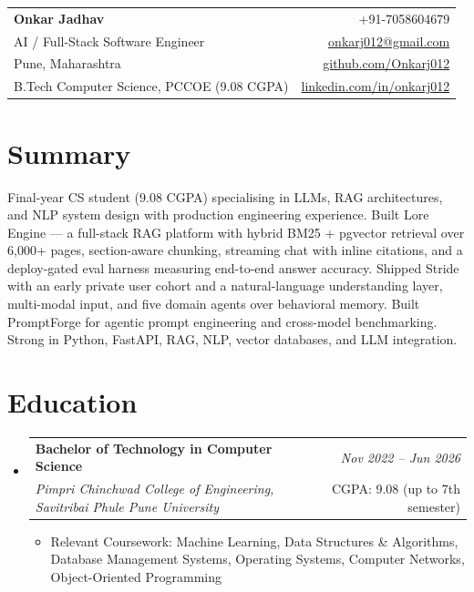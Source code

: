\documentclass[a4paper,11pt]{article}
\makeatletter
\newcommand{\resumeSubheading}[4]{
\vspace{0.5mm}\item
    \begin{tabular*}{0.98\textwidth}[t]{l@{\extracolsep{\fill}}r}
        \textbf{#1} & \textit{\footnotesize{#4}} \\
        \textit{\footnotesize{#3}} & \footnotesize{#2}\\
    \end{tabular*}
    \vspace{-2.4mm}
}
\newcommand{\resumeSubHeadingListStart}{\begin{itemize}[leftmargin=*,labelsep=0mm]}
\newcommand{\resumeItemListStart}{\begin{justify}\begin{itemize}[leftmargin=3ex, rightmargin=2ex, noitemsep,labelsep=1.2mm,itemsep=0mm]\small}
\newcommand{\resumeSubHeadingListEnd}{\end{itemize}\vspace{2mm}}
\newcommand{\resumeItemListEnd}{\end{itemize}\end{justify}\vspace{-2mm}}
\newcommand{\name}{Onkar Jadhav}
\newcommand{\phone}{7058604679}
\newcommand{\emaila}{onkarj012@gmail.com}
\newcommand{\github}{github.com/Onkarj012}
\newcommand{\linkedin}{linkedin.com/in/onkarj012}
\makeatother
\begin{document}
\begin{tabularx}{\linewidth}{L r}
  \textbf{\Large \name} & {+91-\phone} \\
  {AI / Full-Stack Software Engineer} & \href{mailto:\emaila}{\emaila} \\
  {Pune, Maharashtra} & \href{https://\github}{\github} \\
  {B.Tech Computer Science, PCCOE (9.08 CGPA)} & \href{https://\linkedin}{\linkedin}
\end{tabularx}
\vspace{-4mm}

\section{\textbf{Summary}}
\vspace{1mm}
\small{
Final-year CS student (9.08 CGPA) specialising in LLMs, RAG architectures, and NLP system design with production engineering experience. Built Lore Engine --- a full-stack RAG platform with hybrid BM25 + pgvector retrieval over 6,000+ pages, section-aware chunking, streaming chat with inline citations, and a deploy-gated eval harness measuring end-to-end answer accuracy. Shipped Stride with an early private user cohort and a natural-language understanding layer, multi-modal input, and five domain agents over behavioral memory. Built PromptForge for agentic prompt engineering and cross-model benchmarking. Strong in Python, FastAPI, RAG, NLP, vector databases, and LLM integration.
}
\vspace{-3mm}

\section{\textbf{Education}}
  \resumeSubHeadingListStart
    \resumeSubheading
      {Bachelor of Technology in Computer Science}{CGPA: 9.08 (up to 7th semester)}
      {Pimpri Chinchwad College of Engineering, Savitribai Phule Pune University}{Nov 2022 -- Jun 2026}
      \resumeItemListStart
        \item {Relevant Coursework: Machine Learning, Data Structures \& Algorithms, Database Management Systems, Operating Systems, Computer Networks, Object-Oriented Programming}
      \resumeItemListEnd
  \resumeSubHeadingListEnd
\vspace{-5.5mm}

\end{document}
